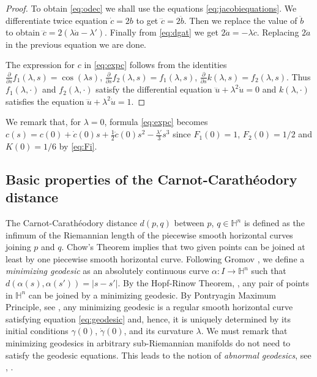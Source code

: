 \documentclass[10pt]{amsart}
\theoremstyle{definition}
\theoremstyle{remark}
\numberwithin{equation}{section}
\begin{document}
\begin{proof}
To obtain \eqref{eq:odec} we shall use the equations \eqref{eq:jacobiequations}. We differentiate twice equation $\dot{c}=2b$ to get $\dddot{c}=2\ddot{b}$. Then we replace the value of $\ddot{b}$ to obtain $\dddot{c}=2({\lambda}\dot{a}-{\lambda}')$. Finally from \eqref{eq:dgat} we get $2\dot{a}=-{\lambda}\dot{c}$. Replacing $2\dot{a}$ in the previous equation we are done.

The expression for $c$ in \eqref{eq:expc} follows from the identities $\tfrac{\partial}{{\partial} s}f_1({\lambda}, s)=\cos({\lambda} s)$, $\tfrac{\partial}{{\partial} s}f_2({\lambda}, s)=f_1({\lambda}, s)$, $\tfrac{\partial}{{\partial} s}k({\lambda} ,s)=f_2({\lambda}, s)$. Thus $f_1({\lambda},\cdot)$ and $f_2({\lambda},\cdot)$ satisfy the differential equation $\dddot{u}+{\lambda}^2\dot{u}=0$ and $k({\lambda},\cdot)$ satisfies the equation $\dddot{u}+{\lambda}^2\dot{u}=1$.
\end{proof}

We remark that, for ${\lambda}=0$, formula \eqref{eq:expc} becomes $c(s)=c(0)+\dot{c}(0)s+\tfrac{1}{2}\ddot{c}(0)s^2-\tfrac{{\lambda}'}{3}s^3$ since $F_1(0)=1$, $F_2(0)=1/2$ and $K(0)=1/6$ by \eqref{eq:Fi}.

\subsection{Basic properties of the Carnot-Carath\'eodory distance}

The Carnot-Carath\'eodory distance $d(p,q)$ between $p$, $q\in{{\mathbb{H}}}^n$ is defined as the infimum of the Riemannian length of the piecewise smooth horizontal curves joining $p$ and $q$.  Chow's Theorem \cite{MR1421823} implies that two given points can be joined at least by one piecewise smooth horizontal curve.  Following Gromov \cite[Ch.~1]{MR2307192}, we define a \emph{minimizing geodesic} as an absolutely continuous curve $\alpha:I\to{{\mathbb{H}}}^n$ such that $d(\alpha(s),\alpha(s'))=|s-s'|$.  By the Hopf-Rinow Theorem, \cite{MR2307192}, any pair of points in ${{\mathbb{H}}}^n$ can be joined by a minimizing geodesic.  By Pontryagin Maximum Principle, see \cite{MR1976833}, any minimizing geodesic is a regular smooth horizontal curve satisfying equation \eqref{eq:geodesic} and, hence, it is uniquely determined by its initial conditions ${\gamma}(0)$, $\dot{\gamma}(0)$, and its curvature ${\lambda}$. We must remark that minimizing geodesics in arbitrary sub-Riemannian manifolds do not need to satisfy the geodesic equations. This leads to the notion of \emph{abnormal geodesics}, see \cite{MR1867362}, \cite{MR2421548}.
\end{document}
